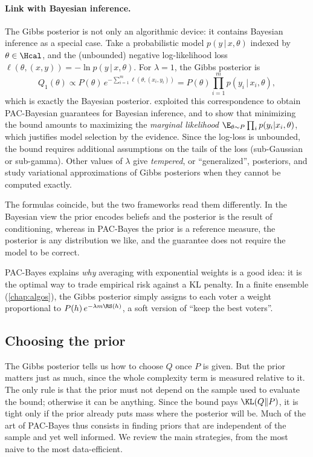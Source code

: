 \paragraph{Link with Bayesian inference.}
The Gibbs posterior is not only an algorithmic device: it contains Bayesian
inference as a special case. Take a probabilistic model $p(y\,|\,x,\theta)$
indexed by $\theta\in\Hcal$, and the (unbounded) negative log-likelihood loss
$\ell(\theta,(x,y))=-\ln p(y\,|\,x,\theta)$. For $\lambda=1$, the Gibbs posterior is
\[
Q_1(\theta)\propto P(\theta)\,e^{-\sum_{i=1}^m\ell(\theta,(x_i,y_i))}=P(\theta)\prod_{i=1}^mp(y_i\,|\,x_i,\theta),
\]
which is exactly the Bayesian posterior. \citet{germain2016pac} exploited this
correspondence to obtain PAC-Bayesian guarantees for Bayesian inference, and to
show that minimizing the bound amounts to maximizing the \emph{marginal
likelihood} $\E_{\theta\sim P}\prod_i p(y_i|x_i,\theta)$, which justifies model
selection by the evidence. Since the log-loss is unbounded, the bound requires
additional assumptions on the tails of the loss (sub-Gaussian or sub-gamma).
Other values of $\lambda$ give \emph{tempered}, or ``generalized'', posteriors,
and \citet{alquier2016properties} study variational approximations of Gibbs
posteriors when they cannot be computed exactly.

The formulas coincide, but the two frameworks read them differently. In the
Bayesian view the prior encodes beliefs
and the posterior is the result of conditioning, whereas in PAC-Bayes the prior
is a reference measure, the posterior is any distribution we like, and the
guarantee does not require the model to be correct.

\begin{intuition}
PAC-Bayes explains \emph{why} averaging with exponential weights is a good idea:
it is the optimal way to trade empirical risk against a KL penalty. In a
finite ensemble (\cref{chap:algos}), the Gibbs posterior simply assigns to
each voter a weight proportional to $P(h)\,e^{-\lambda m\RS(h)}$, a soft version
of ``keep the best voters''.
\end{intuition}

\subsection{Choosing the prior}\label{sec:prior}

The Gibbs posterior tells us how to choose $Q$ once $P$ is given. But the
prior matters just as much, since the whole complexity term is measured
relative to it. The only rule is that the prior must not depend on the sample
used to evaluate the bound; otherwise it can be anything. Since the bound pays
$\KL(Q\|P)$, it is tight only if the prior already puts mass where the
posterior will be. Much of the art of PAC-Bayes thus consists in finding priors
that are independent of the sample and yet well informed. We review the main
strategies, from the most naive to the most data-efficient.

